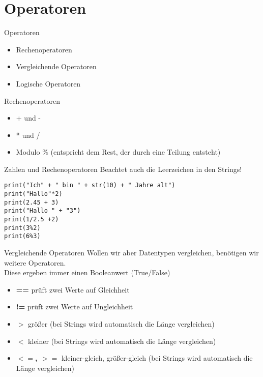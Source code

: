 \section{Operatoren}

\begin{frame}[fragile]{Operatoren}
\begin{itemize}
	\item Rechenoperatoren 
	\item Vergleichende Operatoren
	\item Logische Operatoren
\end{itemize}
\end{frame}

\begin{frame}[fragile]{Rechenoperatoren}
\begin{itemize}
\item + und -
\item * und /
\item Modulo \% (entspricht dem Rest, der durch eine Teilung entsteht)
\end{itemize}
\end{frame}


\begin{frame}[fragile]{Zahlen und Rechenoperatoren}
Beachtet auch die Leerzeichen in den Strings!
\begin{lstlisting}
print("Ich" + " bin " + str(10) + " Jahre alt") 
print("Hallo"*2)
print(2.45 + 3)
print("Hallo " + "3")
print(1/2.5 +2)
print(3%2)
print(6%3)
\end{lstlisting}
\end{frame}



\begin{frame}[fragile]{Vergleichende Operatoren}
Wollen wir aber Datentypen vergleichen, benötigen wir weitere Operatoren.\\
Diese ergeben immer einen Booleanwert (True/False)\\

\begin{itemize}
\item \textbf{==} prüft zwei Werte auf Gleichheit
\item \textbf{!=} prüft zwei Werte auf Ungleichheit
\item \textbf{$>$} größer (bei Strings wird automatisch die Länge vergleichen)
\item \textbf{$<$} kleiner (bei Strings wird automatisch die Länge vergleichen)
\item \textbf{$<=$, $>=$}  kleiner-gleich, größer-gleich (bei Strings wird automatisch die Länge vergleichen)

\end{itemize}
\end{frame}


